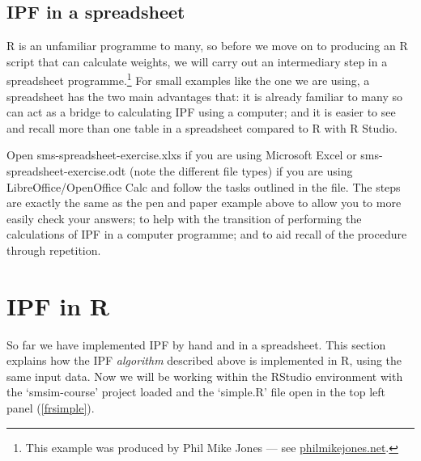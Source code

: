 \documentclass[a4paper, 11pt, twoside]{article}
\begin{document}

\subsection{IPF in a spreadsheet}
R is an unfamiliar programme to many, so before we move on to producing an R script that can calculate weights, we will carry out an intermediary step in a spreadsheet programme.\footnote{This
example was produced by Phil Mike Jones --- see \href{http://www.philmikejones.net/}{philmikejones.net}.}
For small examples like the one we are using, a spreadsheet has the two main advantages that: it is already familiar to many so can act as a bridge to calculating IPF using a computer; and it is easier to see and recall more than one table in a spreadsheet compared to R with R Studio.

Open sms-spreadsheet-exercise.xlxs if you are using Microsoft Excel or sms-spreadsheet-exercise.odt (note the different file types) if you are using LibreOffice/OpenOffice Calc and follow the tasks outlined in the file. The steps are exactly the same as the pen and paper example above to allow you to more easily check your answers; to help with the transition of performing the calculations of IPF in a computer programme; and to aid recall of the procedure through repetition.

\section{IPF in R} \label{simplementing}
So far we have implemented IPF by hand and in a spreadsheet.
This section explains how the IPF
\emph{algorithm} described above is implemented in R, using the
same input data. Now we will be working within the RStudio
environment with the `smsim-course' project 
loaded and the `simple.R' file open in the top left panel
(\cref{frsimple}). 
\end{document}
